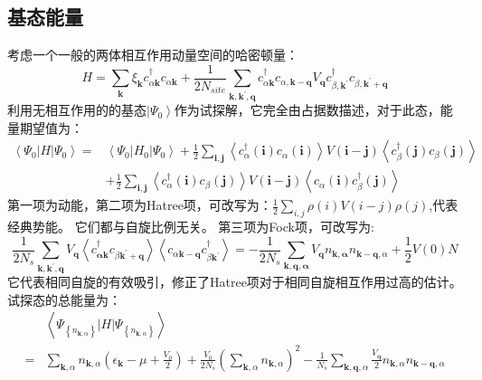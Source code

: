 \documentclass[10pt,openany]{book}
\theoremstyle{thmstyle} %
\theoremstyle{defstyle} %
\theoremstyle{prostyle} %
\begin{document}
\subsection{基态能量}
考虑一个一般的两体相互作用动量空间的哈密顿量：
\begin{equation}
  H=\sum_{\mathbf{k}} \xi_{\mathbf{k}} c_{\alpha \mathbf{k}}^{\dagger} c_{\alpha \mathbf{k}}+\frac{1}{2 N_{s i t e}} \sum_{\mathbf{k}, \mathbf{k}^{\prime}, \mathbf{q}} c_{\alpha \mathbf{k}}^{\dagger} c_{\alpha, \mathbf{k}-\mathbf{q}} V_{\mathbf{q}} c_{\beta, \mathbf{k}^{\prime}}^{\dagger} c_{\beta, \mathbf{k}^{\prime}+\mathbf{q}}
\end{equation}
利用无相互作用的的基态$ \left|\Psi_0\right\rangle $作为试探解，它完全由占据数描述，对于此态，能量期望值为：
\begin{equation}
  \begin{aligned}
    \left\langle\Psi_0|H| \Psi_0\right\rangle= & \left\langle\Psi_0\left|H_0\right| \Psi_0\right\rangle+\frac{1}{2} \sum_{\mathbf{i}, \mathbf{j}}\left\langle c_\alpha^{\dagger}(\mathbf{i}) c_\alpha(\mathbf{i})\right\rangle V(\mathbf{i}-\mathbf{j})\left\langle c_\beta^{\dagger}(\mathbf{j}) c_\beta(\mathbf{j})\right\rangle \\
    & +\frac{1}{2} \sum_{\mathbf{i}, \mathbf{j}}\left\langle c_\alpha^{\dagger}(\mathbf{i}) c_\beta(\mathbf{j})\right\rangle V(\mathbf{i}-\mathbf{j})\left\langle c_\alpha(\mathbf{i}) c_\beta^{\dagger}(\mathbf{j})\right\rangle
    \end{aligned}
\end{equation} 
第一项为动能，第二项为Hatree项，可改写为：$ \frac{1}{2} \sum_{i, j} \rho(i) V(i-j) \rho(j) $,代表经典势能。 它们都与自旋比例无关。
第三项为Fock项，可改写为:
\begin{equation*}
  \frac{1}{2 N_s} \sum_{\mathbf{k}, \mathbf{k}^{\prime}, \mathbf{q}} V_{\mathbf{q}}\left\langle c_{\mathbf{\alpha k}}^{\dagger} c_{\beta \mathbf{k}^{\prime}+\mathbf{q}}\right\rangle\left\langle c_{\alpha \mathbf{k}-\mathbf{q}} c_{\beta \mathbf{k}^{\prime}}^{\dagger}\right\rangle=-\frac{1}{2 N_s} \sum_{\mathbf{k , \mathbf { q } , \mathbf { \alpha }}} V_{\mathbf{q}} n_{\mathbf{k}, \mathbf{\alpha}} n_{\mathbf{k}-\mathbf{q}, \alpha}+\frac{1}{2} V(0) N
\end{equation*}
它代表相同自旋的有效吸引，修正了Hatree项对于相同自旋相互作用过高的估计。试探态的总能量为：
\begin{equation}
  \begin{aligned}
    & \left\langle\Psi_{\left\{n_{\mathbf{k}, \alpha}\right\}}|H| \Psi_{\left\{n_{\mathbf{k}, \alpha}\right\}}\right\rangle \\
    = & \sum_{\mathbf{k}, \alpha} n_{\mathbf{k}, \alpha}\left(\epsilon_{\mathbf{k}}-\mu+\frac{V_0}{2}\right)+\frac{V_0}{2 N_s}\left(\sum_{\mathbf{k}, \alpha} n_{\mathbf{k}, \alpha}\right)^2-\frac{1}{N_s} \sum_{\mathbf{k}, \mathbf{q}, \alpha} \frac{V_{\mathbf{q}}}{2} n_{\mathbf{k}, \alpha} n_{\mathbf{k}-\mathbf{q}, \alpha}
    \end{aligned}
\end{equation}
\end{document}
